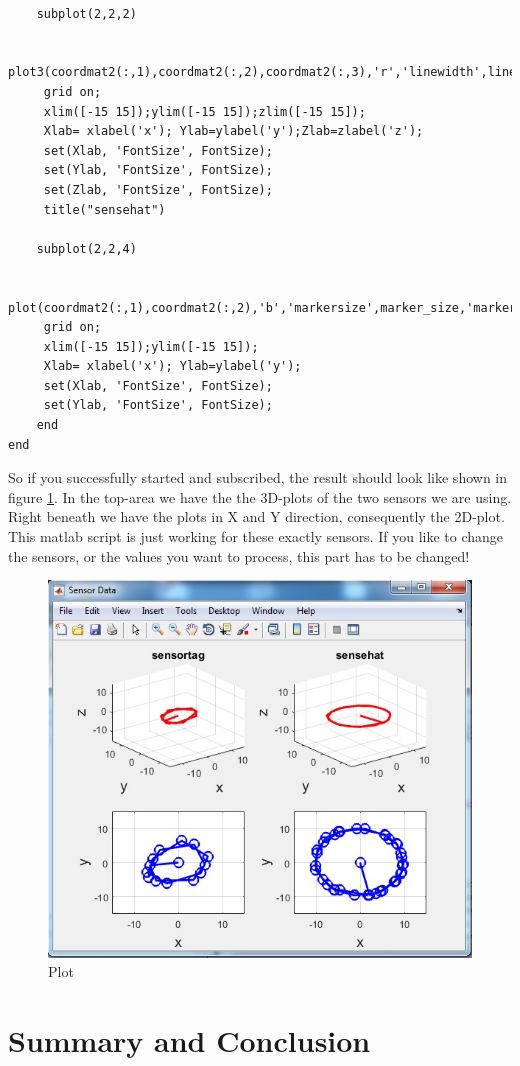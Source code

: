 \documentclass[12pt]{article}
\begin{document}
\begin{lstlisting}

	subplot(2,2,2)

	 plot3(coordmat2(:,1),coordmat2(:,2),coordmat2(:,3),'r','linewidth',line_wid);
	 grid on;
	 xlim([-15 15]);ylim([-15 15]);zlim([-15 15]);
	 Xlab= xlabel('x'); Ylab=ylabel('y');Zlab=zlabel('z');
	 set(Xlab, 'FontSize', FontSize);
	 set(Ylab, 'FontSize', FontSize);
	 set(Zlab, 'FontSize', FontSize);    
	 title("sensehat")

	subplot(2,2,4)

	 plot(coordmat2(:,1),coordmat2(:,2),'b','markersize',marker_size,'marker','o','linewidth',line_wid);
	 grid on;    
	 xlim([-15 15]);ylim([-15 15]);
	 Xlab= xlabel('x'); Ylab=ylabel('y');
	 set(Xlab, 'FontSize', FontSize);
	 set(Ylab, 'FontSize', FontSize);
	end        
end

\end{lstlisting}

So if you successfully started and subscribed, the result should look like shown in figure \ref{fig:Plot2.jpg}.
In the top-area we have the the 3D-plots of the two sensors we are using. Right beneath we have the plots in X and Y direction, consequently the 2D-plot. This matlab script is just working for these exactly sensors. If you like to change the sensors, or the values you want to process, this part has to be changed!
\begin{figure}[H]
	\includegraphics[width=0.5\linewidth]{Plot.jpg}
	\centering
	\caption{Plot}
	\label{fig:Plot2.jpg}
\end{figure}

\section{Summary and Conclusion}
\end{document}
